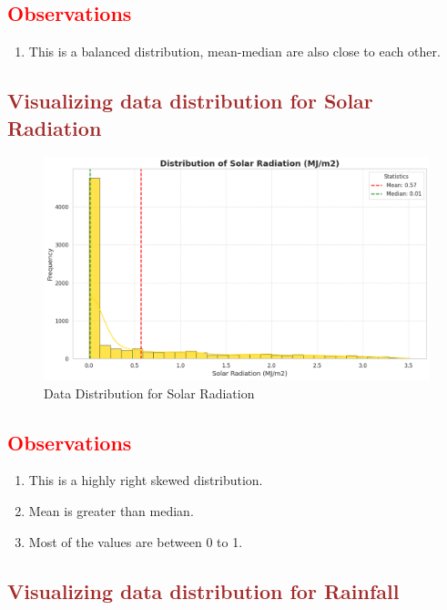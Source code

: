 \documentclass[12pt, letterpaper]{article}
\begin{document}
\subsection*{\textcolor{red}{Observations}}
\begin{enumerate}
  \item This is a balanced distribution, mean-median are also close to each other.
\end{enumerate}


\newpage

\subsection*{\textcolor{brown}{Visualizing data distribution for Solar Radiation}}

\begin{figure}[h]
  \centering
  \includegraphics[width=1\textwidth]{solar.png}
  \caption{Data Distribution for Solar Radiation}
\end{figure}

\subsection*{\textcolor{red}{Observations}}
\begin{enumerate}
  \item This is a highly right skewed distribution.
  \item Mean is greater than median.
  \item Most of the values are between 0 to 1.
\end{enumerate}

\newpage

\subsection*{\textcolor{brown}{Visualizing data distribution for Rainfall}}
\end{document}
